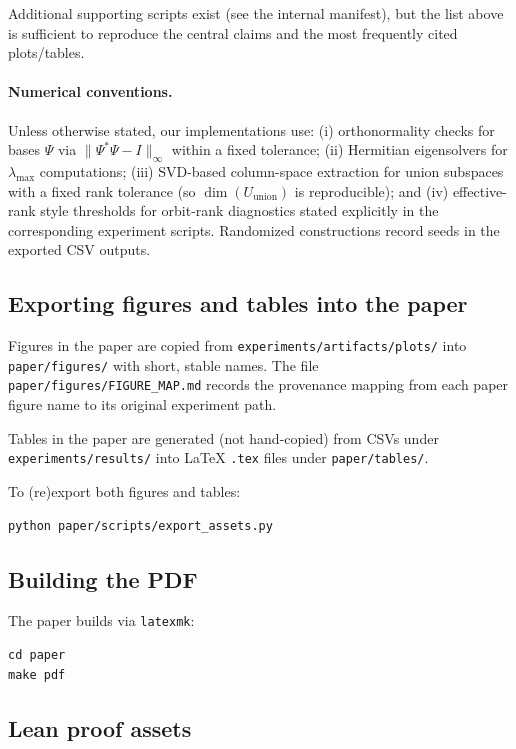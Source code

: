 \documentclass[11pt]{article}
\theoremstyle{plain}
\theoremstyle{definition}
\theoremstyle{remark}
\begin{document}
\noindent
Additional supporting scripts exist (see the internal manifest), but the list above is sufficient to reproduce the central claims and the most frequently cited plots/tables.

\paragraph{Numerical conventions.}
Unless otherwise stated, our implementations use:
(i) orthonormality checks for bases \(\Psi\) via \(\|\Psi^\ast\Psi-I\|_\infty\) within a fixed tolerance;
(ii) Hermitian eigensolvers for \(\lambda_{\max}\) computations;
(iii) SVD-based column-space extraction for union subspaces with a fixed rank tolerance (so \(\dim(U_{\mathrm{union}})\) is reproducible);
and (iv) effective-rank style thresholds for orbit-rank diagnostics stated explicitly in the corresponding experiment scripts.
Randomized constructions record seeds in the exported CSV outputs.

\subsection{Exporting figures and tables into the paper}

Figures in the paper are copied from \texttt{experiments/artifacts/plots/} into \texttt{paper/figures/} with short, stable names.
The file \texttt{paper/figures/FIGURE\_MAP.md} records the provenance mapping from each paper figure name to its original experiment path.

Tables in the paper are generated (not hand-copied) from CSVs under \texttt{experiments/results/} into LaTeX \texttt{.tex} files under \texttt{paper/tables/}.

To (re)export both figures and tables:

\begin{verbatim}
python paper/scripts/export_assets.py
\end{verbatim}

\subsection{Building the PDF}

The paper builds via \texttt{latexmk}:

\begin{verbatim}
cd paper
make pdf
\end{verbatim}

\subsection{Lean proof assets}
\end{document}
